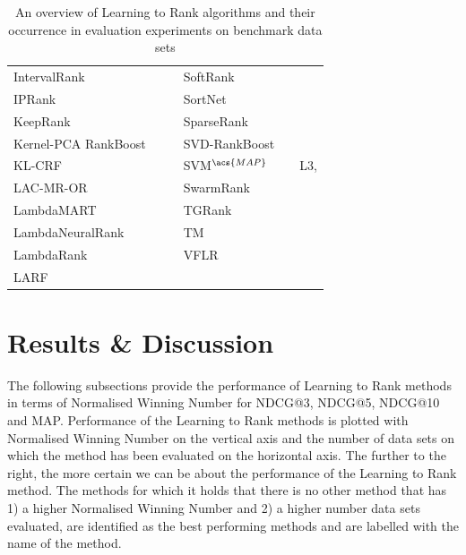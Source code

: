\begin{table}[!h!p]
{\begin{tabular}{|l|l|l||l|l|l|}
IntervalRank & \cite{Moon2010} & \cite{Moon2010, Freno2011} & SoftRank & \cite{Taylor2008, Guiver2008} & \cite{Qin2010b} \\ 
\acs{IP}Rank & \cite{Wang2009b} & \cite{Wang2009b, Torkestani2012} & SortNet & \cite{Rigutini2008} & \cite{Rigutini2008,Freno2011} \\
KeepRank & \cite{Chen2009} & \cite{Chen2009} & SparseRank & \cite{Lai2013b} & \cite{Lai2013b} \\ 
Kernel-\acs{PCA} RankBoost & \cite{Duh2008} & \cite{Duh2008, Sato2013} & \acs{SVD}-RankBoost & \cite{Lin2009} & \cite{Lin2009} \\
KL-\acs{CRF} & \cite{Volkovs2011} & \cite{Volkovs2011} & \acs{SVM}$^{\acs{MAP}}$ & \cite{Yue2007} & L3, \cite{Wang2012, Xu2008, Niu2012} \\ 
LAC-MR-OR & \cite{Veloso2008} & \cite{Veloso2008} & SwarmRank & \cite{Diaz-Aviles2009} & \cite{Sato2013} \\ 
LambdaMART & \cite{Burges2010} & \cite{Asadi2013a, Ganjisaffar2011c} & TGRank & \cite{Lai2013} & \cite{Lai2013} \\ 
LambdaNeuralRank & \cite{Papini2012} & \cite{Papini2012} & TM & \cite{Zhou2008} & \cite{Zhou2008, Papini2012, Tan2013} \\ 
LambdaRank & \cite{Burges2006} &  & VFLR & \cite{Cai2012} & \cite{Cai2012} \\ 
LARF & \cite{Torkestani2012} & \cite{Torkestani2012} &  &  &  \\ 
\end{tabular}}
\caption{An overview of Learning to Rank algorithms and their occurrence in evaluation experiments on benchmark data sets}
\label{tab:ltr_methods_used}
\end{table}

\section{Results \& Discussion}
The following subsections provide the performance of Learning to Rank methods in terms of Normalised Winning Number for \ac{NDCG}@3, \ac{NDCG}@5, \ac{NDCG}@10 and \ac{MAP}. Performance of the Learning to Rank methods is plotted with Normalised Winning Number on the vertical axis and the number of data sets on which the method has been evaluated on the horizontal axis. The further to the right, the more certain we can be about the performance of the Learning to Rank method. The methods for which it holds that there is no other method that has 1) a higher Normalised Winning Number and 2) a higher number data sets evaluated, are identified as the best performing methods and are labelled with the name of the method.

